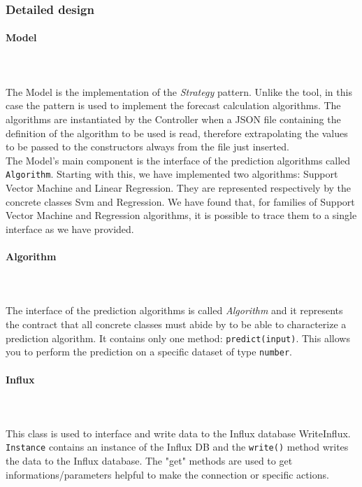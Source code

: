 \subsubsection{Detailed design}
\paragraph{Model}\mbox{} \\ \mbox{} \\
The Model is the implementation of the \textit{Strategy} pattern. Unlike the tool, in this case the pattern is used to implement the forecast calculation algorithms.
The algorithms are instantiated by the Controller when a JSON file containing the definition of the algorithm to be used is read, therefore extrapolating the values to be passed to the constructors always from the file just inserted.\\
The Model's main component is the interface of the prediction algorithms
called \texttt{Algorithm}. Starting with this, we have implemented
two algorithms: Support Vector Machine and Linear Regression.
They are represented respectively by the concrete classes Svm and Regression. We have found that, for families of Support Vector Machine and Regression algorithms, it is possible to trace them to a single interface as we have provided.

\paragraph*{Algorithm}\mbox{} \\ \mbox{} \\
The interface of the prediction algorithms is called \textit{Algorithm} and it
represents the contract that all concrete classes must abide by
to be able to characterize a prediction algorithm. It contains only one method:
\texttt{predict(input)}. This allows you to perform the prediction on a specific dataset of type \texttt{number}.

\paragraph*{Influx}\mbox{} \\ \mbox{} \\
This class is used to interface and write data to the Influx database WriteInflux. \texttt{Instance} contains an instance of the Influx DB and the \texttt{write()} method writes the data to the Influx database. The "get" methods are used to get informations/parameters helpful to make the connection or specific actions.

